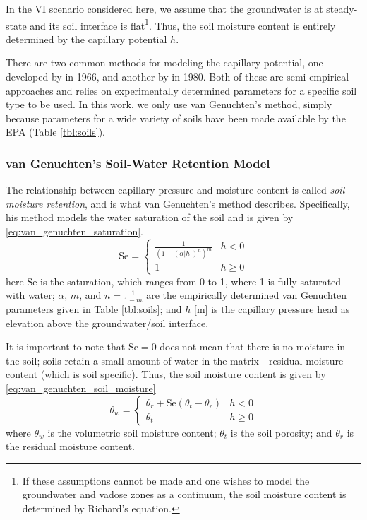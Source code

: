 In the VI scenario considered here, we assume that the groundwater is at steady-state and its soil interface is flat\footnote{
If these assumptions cannot be made and one wishes to model the groundwater and vadose zones as a continuum, the soil moisture content is determined by Richard's equation.
}.
Thus, the soil moisture content is entirely determined by the capillary potential $h$.\par

There are two common methods for modeling the capillary potential, one developed by \citeauthor{brooks_properties_1966}\cite{brooks_properties_1966} in 1966, and another by \citeauthor{van_genuchten_closed-form_1980}\cite{van_genuchten_closed-form_1980} in 1980.
Both of these are semi-empirical approaches and relies on experimentally determined parameters for a specific soil type to be used.
In this work, we only use van Genuchten's method, simply because parameters for a wide variety of soils have been made available by the EPA (Table \ref{tbl:soils}).\par

\subsubsection{van Genuchten's Soil-Water Retention Model}

The relationship between capillary pressure and moisture content is called \textit{soil moisture retention}, and is what van Genuchten's method describes.
Specifically, his method models the water saturation of the soil and is given by \eqref{eq:van_genuchten_saturation}.
\begin{equation}\label{eq:van_genuchten_saturation}
  \mathrm{Se} =
    \begin{cases}
      \frac{1}{(1 + (\alpha |h|)^n)^m} & h < 0 \\
    1 & h \geq 0
    \end{cases}
\end{equation}
here $\mathrm{Se}$ is the saturation, which ranges from 0 to 1, where 1 is fully saturated with water;
$\alpha$, $m$, and $n=\frac{1}{1-m}$ are the empirically determined van Genuchten parameters given in Table \ref{tbl:soils};
and $h$ [\si{\metre}] is the capillary pressure head as elevation above the groundwater/soil interface.\par

It is important to note that $\mathrm{Se} = 0$ does not mean that there is no moisture in the soil; soils retain a small amount of water in the matrix - residual moisture content (which is soil specific).
Thus, the soil moisture content is given by \eqref{eq:van_genuchten_soil_moisture}
\begin{equation}\label{eq:van_genuchten_soil_moisture}
  \theta_w =
    \begin{cases}
      \theta_r + \mathrm{Se}(\theta_t - \theta_r) & h < 0 \\
      \theta_t & h \geq 0
    \end{cases}
\end{equation}
where $\theta_w$ is the volumetric soil moisture content;
$\theta_t$ is the soil porosity;
and $\theta_r$ is the residual moisture content.\par

